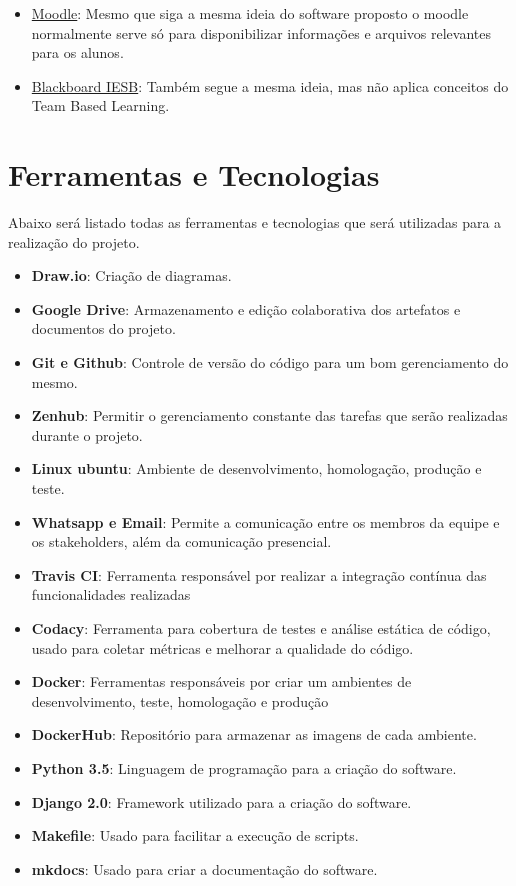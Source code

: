 \begin{itemize}
  \item \href{https://aprender.unb.br/}{Moodle}: Mesmo que siga a mesma ideia do software proposto o moodle normalmente serve só para disponibilizar informações e arquivos relevantes para os alunos.
  \item \href{https://iesb.blackboard.com/}{Blackboard IESB}: Também segue a mesma ideia, mas não aplica conceitos do Team Based Learning.
\end{itemize}

\section{Ferramentas e Tecnologias}

Abaixo será listado todas as ferramentas e tecnologias que será utilizadas para a realização do projeto.

\begin{itemize}
  \item \textbf{Draw.io}: Criação de diagramas.
  \item \textbf{Google Drive}: Armazenamento e edição colaborativa dos artefatos e documentos do projeto.
  \item \textbf{Git e Github}: Controle de versão do código para um bom gerenciamento do mesmo.
  \item \textbf{Zenhub}: Permitir o gerenciamento constante das tarefas que serão realizadas durante o projeto.
  \item \textbf{Linux ubuntu}: Ambiente de desenvolvimento, homologação, produção e teste.
  \item \textbf{Whatsapp e Email}: Permite a comunicação entre os membros da equipe e os stakeholders, além da
    comunicação presencial.
  \item \textbf{Travis CI}: Ferramenta responsável por realizar a integração contínua das funcionalidades realizadas
  \item \textbf{Codacy}: Ferramenta para cobertura de testes e análise estática de código, usado para coletar métricas e
    melhorar a qualidade do código.
  \item \textbf{Docker}: Ferramentas responsáveis por criar um ambientes de desenvolvimento, teste, homologação e produção
  \item \textbf{DockerHub}: Repositório para armazenar as imagens de cada ambiente.
  \item \textbf{Python 3.5}: Linguagem de programação para a criação do software.
  \item \textbf{Django 2.0}: Framework utilizado para a criação do software.
  \item \textbf{Makefile}: Usado para facilitar a execução de scripts.
  \item \textbf{mkdocs}: Usado para criar a documentação do software.
\end{itemize}

